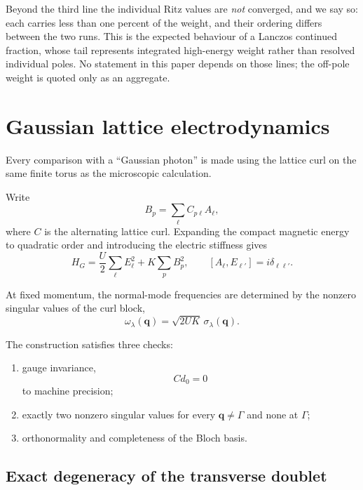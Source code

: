 \documentclass[
aps,
prl,
onecolumn,
amsmath,
amssymb,
superscriptaddress,
longbibliography
]{revtex4-2}
\newcommand{\bq}{\bm q}
\begin{document}
Beyond the third line the individual Ritz values are \emph{not}
converged, and we say so: each carries less than one percent of the
weight, and their ordering differs between the two runs. This is the
expected behaviour of a Lanczos continued fraction, whose tail
represents integrated high-energy weight rather than resolved
individual poles. No statement in this paper depends on those lines;
the off-pole weight is quoted only as an aggregate.

\section{Gaussian lattice electrodynamics}
\label{sec:gaussian}

Every comparison with a ``Gaussian photon'' is made using the lattice
curl on the same finite torus as the microscopic calculation.

Write
\begin{equation}
B_p
=
\sum_\ell C_{p\ell}A_\ell,
\end{equation}
where $C$ is the alternating lattice curl.
Expanding the compact magnetic energy to quadratic order and
introducing the electric stiffness gives
\begin{equation}
H_G
=
\frac{U}{2}
\sum_\ell E_\ell^2
+
K\sum_p B_p^2,
\qquad
[A_\ell,E_{\ell'}]
=
i\delta_{\ell\ell'} .
\label{eq:hg}
\end{equation}

At fixed momentum, the normal-mode frequencies are determined by the
nonzero singular values of the curl block,
\begin{equation}
\omega_\lambda(\bq)
=
\sqrt{2UK}\,
\sigma_\lambda(\bq).
\label{eq:gaussian}
\end{equation}

The construction satisfies three checks:
\begin{enumerate}
\item gauge invariance,
\begin{equation}
Cd_0=0
\end{equation}
to machine precision;
\item exactly two nonzero singular values for every
$\bq\neq\Gamma$ and none at $\Gamma$;
\item orthonormality and completeness of the Bloch basis.
\end{enumerate}

\subsection{Exact degeneracy of the transverse doublet}
\label{sec:degeneracy}
\end{document}
